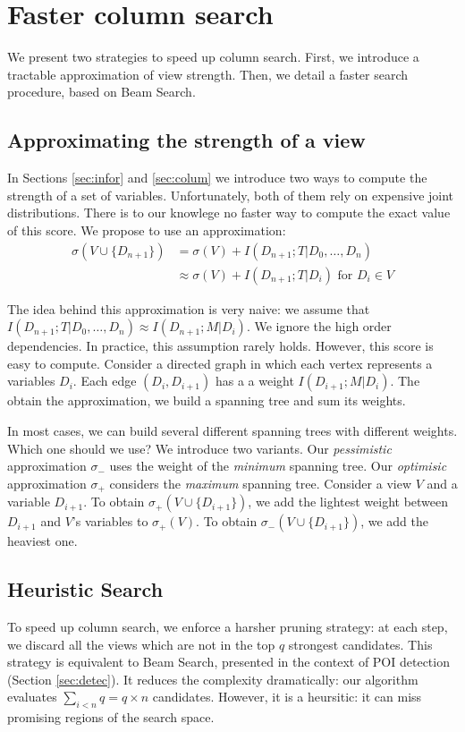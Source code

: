  
\section{Faster column search}

We present two strategies to speed up column search. First, we introduce a
tractable approximation of view strength. Then, we detail a faster search
procedure, based on Beam Search.

\subsection{Approximating the strength of a view}

In Sections \ref{sec:infor} and \ref{sec:colum} we introduce two ways to
compute the strength of a set of variables. Unfortunately, both of them rely on
expensive joint distributions. There is to our knowlege no faster way to
compute the exact value of this score. We propose to use an approximation:
\[
\begin{split}
    \sigma(V \cup \{D_{n+1}\}) & = \sigma(V)   + I(D_{n+1} ; T | D_0, \ldots, D_{n})\\
                           & \approx \sigma(V) + I(D_{n+1} ; T | D_{i})
\text{ for } D_i \in V
\end{split}
\]

The idea behind this approximation is very naive: we assume that $I(D_{n+1} ; T
| D_0, \ldots, D_{n}) \approx I(D_{n+1} ; M | D_{i})$. We ignore the high order
dependencies. In practice, this assumption rarely holds. 
However, this score is easy to compute. Consider
a directed graph in which each vertex represents a variables $D_i$. Each edge
$(D_i, D_{i+1})$ has a a weight $ I(D_{i+1} ; M | D_{i})$.  The obtain the
approximation, we build a spanning tree and sum its weights.

In most cases, we can build several different spanning trees with different
weights. Which one should we use? We introduce two variants.  Our
\emph{pessimistic} approximation $\sigma_- $ uses the weight of the
\emph{minimum} spanning tree.  Our \emph{optimisic} approximation $\sigma_+ $
considers the \emph{maximum} spanning tree. Consider a view $V$ and a variable
$D_{i+1}$. To obtain $\sigma_+(V \cup \{D_{i+1}\})$, we add the lightest weight
between $ D_{i+1}$ and $V$'s variables to $\sigma_+(V)$.  To obtain $\sigma_-(V
\cup \{D_{i+1}\})$, we add the heaviest one.


\subsection{Heuristic Search}
To speed up column search, we enforce a harsher pruning strategy: at each step,
we discard all the views which are not in the top $q$ strongest candidates.
This strategy is equivalent to Beam Search, presented in the context of POI
detection (Section \ref{sec:detec}). It reduces the complexity dramatically:
our algorithm evaluates $\sum_{i < n} q = q \times n$ candidates.  However, it
is a heursitic: it can miss promising regions of the search space.


